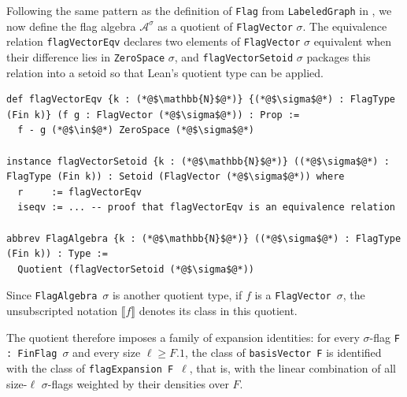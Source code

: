 \documentclass{article}
\newcommand{\lean}[1]{\texttt{#1}}
\begin{document}
Following the same pattern as the definition of \lean{Flag} from
\lean{LabeledGraph} in , we now define
the flag algebra $\mathcal{A}^\sigma$ as a quotient of \lean{FlagVector} $\sigma$.
The equivalence relation \lean{flagVectorEqv} declares two elements of \lean{FlagVector} $\sigma$ equivalent
when their difference lies in \lean{ZeroSpace} $\sigma$, and \lean{flagVectorSetoid} $\sigma$
packages this relation into a setoid so that Lean's quotient type can be applied.
\begin{lstlisting}
def flagVectorEqv {k : (*@$\mathbb{N}$@*)} {(*@$\sigma$@*) : FlagType (Fin k)} (f g : FlagVector (*@$\sigma$@*)) : Prop :=
  f - g (*@$\in$@*) ZeroSpace (*@$\sigma$@*)

instance flagVectorSetoid {k : (*@$\mathbb{N}$@*)} ((*@$\sigma$@*) : FlagType (Fin k)) : Setoid (FlagVector (*@$\sigma$@*)) where
  r     := flagVectorEqv
  iseqv := ... -- proof that flagVectorEqv is an equivalence relation

abbrev FlagAlgebra {k : (*@$\mathbb{N}$@*)} ((*@$\sigma$@*) : FlagType (Fin k)) : Type :=
  Quotient (flagVectorSetoid (*@$\sigma$@*))
\end{lstlisting}
Since \lean{FlagAlgebra}~$\sigma$ is another quotient type, if $f$ is a
\lean{FlagVector}~$\sigma$, the unsubscripted notation $\llbracket f\rrbracket$ denotes
its class in this quotient.

The quotient therefore imposes a family of expansion identities: for every
$\sigma$-flag \lean{F : FinFlag}~$\sigma$ and every size $\ell \geq F.1$, the class of
\lean{basisVector F} is identified with the class of
\lean{flagExpansion F}~$\ell$, that is, with the linear combination of all
size-$\ell$ $\sigma$-flags weighted by their densities over \(F\).
\end{document}
